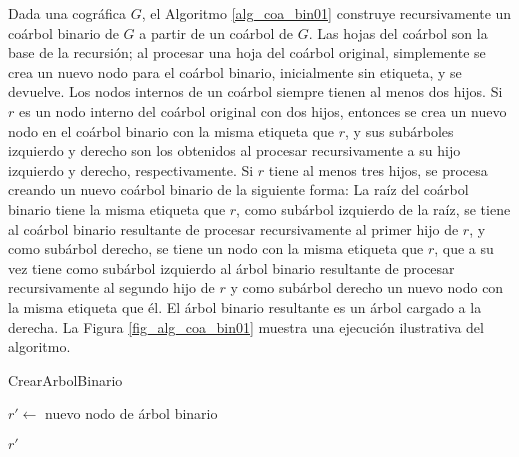 Dada una cogr\'afica $G$, el Algoritmo \ref{alg_coa_bin01} construye
recursivamente un co\'arbol binario de $G$ a partir de un co\'arbol de $G$.
Las hojas del co\'arbol son la base de la recursi\'on; al procesar una hoja
del co\'arbol original, simplemente se crea un nuevo nodo para el co\'arbol
binario, inicialmente sin etiqueta, y se devuelve.  Los nodos internos de
un co\'arbol siempre tienen al menos dos hijos.   Si $r$ es un nodo interno
del co\'arbol original con dos hijos, entonces se crea un nuevo nodo en
el co\'arbol binario con la misma etiqueta que $r$, y sus sub\'arboles
izquierdo y derecho son los obtenidos al procesar recursivamente a su
hijo izquierdo y derecho, respectivamente.   Si $r$ tiene al menos tres
hijos, se procesa creando un nuevo coárbol binario de la siguiente forma:
La raíz del coárbol binario tiene la misma etiqueta que $r$, como
sub\'arbol izquierdo de la ra\'iz, se tiene al coárbol binario resultante
de procesar recursivamente al primer hijo de $r$, y como sub\'arbol derecho,
se tiene un nodo con la misma etiqueta que $r$, que a su vez tiene como
sub\'arbol izquierdo al árbol binario resultante de procesar recursivamente
al segundo hijo de $r$ y como sub\'arbol derecho un nuevo nodo con la misma
etiqueta que \'el. El árbol binario resultante es un árbol cargado a la
derecha. La Figura \ref{fig_alg_coa_bin01} muestra
una ejecución ilustrativa del algoritmo.

\begin{algorithm}[ht!]
\caption{CrearArbolBinario}
\label{alg_coa_bin01}
\DontPrintSemicolon %

$r' \gets $ nuevo nodo de árbol binario\;

\Return $r'$\;

\end{algorithm}

